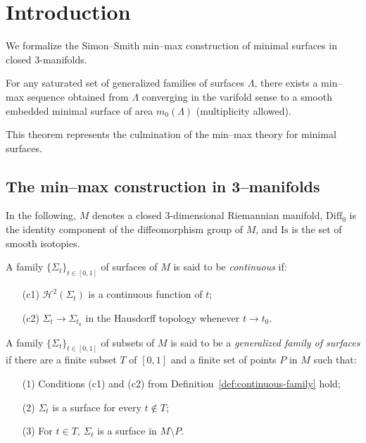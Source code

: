 \chapter{Introduction}

We formalize the Simon--Smith min--max construction of minimal surfaces in closed $3$-manifolds.

\begin{theorem}\label{thm:main}
For any saturated set of generalized families of surfaces $\Lambda$, there exists a min--max sequence obtained from $\Lambda$ converging in the varifold sense to a smooth embedded minimal surface of area $m_0(\Lambda)$ (multiplicity allowed).
\end{theorem}

This theorem represents the culmination of the min--max theory for minimal surfaces.

\section{The min--max construction in 3--manifolds}

In the following, $M$ denotes a closed 3-dimensional Riemannian manifold, $\mathrm{Diff}_0$ is the identity component of the diffeomorphism group of $M$, and $\mathrm{Is}$ is the set of smooth isotopies.

\begin{definition}\label{def:continuous-family}
A family $\{\Sigma_t\}_{t \in [0,1]}$ of surfaces of $M$ is said to be \emph{continuous} if:
\begin{itemize}
\item[(c1)] $\mathcal{H}^2(\Sigma_t)$ is a continuous function of $t$;
\item[(c2)] $\Sigma_t \to \Sigma_{t_0}$ in the Hausdorff topology whenever $t \to t_0$.
\end{itemize}
\uses{}
\end{definition}

\begin{definition}\label{def:gen-family}
\leanok
A family $\{\Sigma_t\}_{t \in [0,1]}$ of subsets of $M$ is said to be a \emph{generalized family of surfaces} if there are a finite subset $T$ of $[0, 1]$ and a finite set of points $P$ in $M$ such that:
\begin{itemize}
\item[(1)] Conditions (c1) and (c2) from Definition~\ref{def:continuous-family} hold;
\item[(2)] $\Sigma_t$ is a surface for every $t \notin T$;
\item[(3)] For $t \in T$, $\Sigma_t$ is a surface in $M \setminus P$.
\end{itemize}
\end{definition}